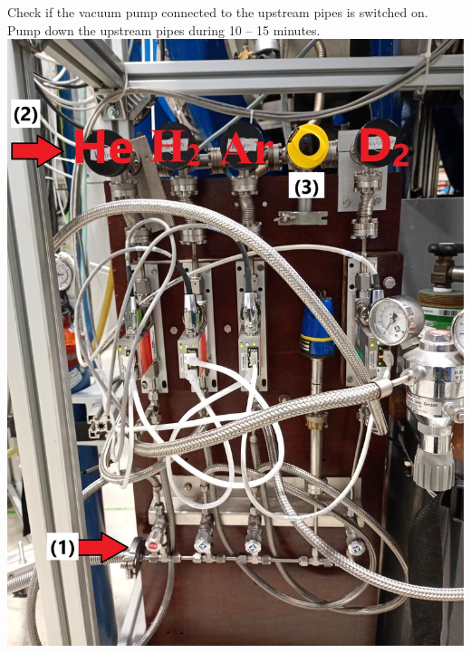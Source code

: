 \documentclass[fleqn,a4paper,20pt]{article}
\begin{document}
\begin{minipage}{.3\textwidth}
	
{Check if the vacuum pump connected to the upstream pipes is switched on. Pump down the upstream pipes during 10 – 15 minutes. }\\

{
	\includegraphics[width=\linewidth]{Gas1}
	\label{Gas1}}
\end{minipage}
\begin{minipage}{.02\textwidth}
	$\ $\\
\end{minipage}
\end{document}
